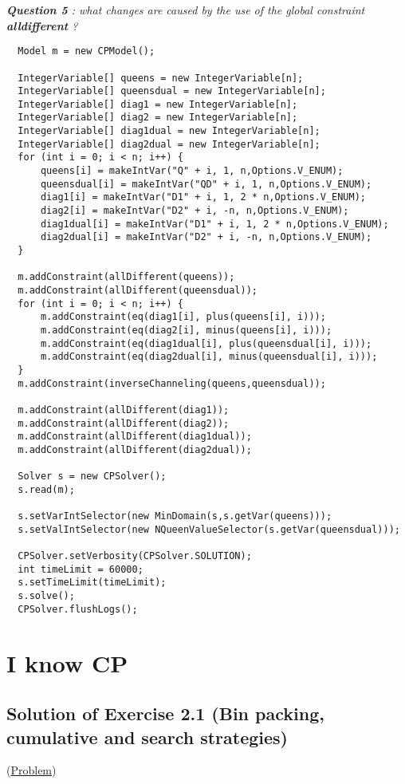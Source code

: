 \noindent\emph{\textbf{Question 5} : what changes are caused by the use of the global constraint \textbf{alldifferent} ?}

\begin{lstlisting}
  Model m = new CPModel();
	
  IntegerVariable[] queens = new IntegerVariable[n];
  IntegerVariable[] queensdual = new IntegerVariable[n];
  IntegerVariable[] diag1 = new IntegerVariable[n];
  IntegerVariable[] diag2 = new IntegerVariable[n];
  IntegerVariable[] diag1dual = new IntegerVariable[n];
  IntegerVariable[] diag2dual = new IntegerVariable[n];
  for (int i = 0; i < n; i++) {
      queens[i] = makeIntVar("Q" + i, 1, n,Options.V_ENUM);
      queensdual[i] = makeIntVar("QD" + i, 1, n,Options.V_ENUM);
      diag1[i] = makeIntVar("D1" + i, 1, 2 * n,Options.V_ENUM);
      diag2[i] = makeIntVar("D2" + i, -n, n,Options.V_ENUM);
      diag1dual[i] = makeIntVar("D1" + i, 1, 2 * n,Options.V_ENUM);
      diag2dual[i] = makeIntVar("D2" + i, -n, n,Options.V_ENUM);
  }
	
  m.addConstraint(allDifferent(queens));
  m.addConstraint(allDifferent(queensdual));
  for (int i = 0; i < n; i++) {
      m.addConstraint(eq(diag1[i], plus(queens[i], i)));
      m.addConstraint(eq(diag2[i], minus(queens[i], i)));
      m.addConstraint(eq(diag1dual[i], plus(queensdual[i], i)));
      m.addConstraint(eq(diag2dual[i], minus(queensdual[i], i)));
  }
  m.addConstraint(inverseChanneling(queens,queensdual));
	
  m.addConstraint(allDifferent(diag1));
  m.addConstraint(allDifferent(diag2));
  m.addConstraint(allDifferent(diag1dual));
  m.addConstraint(allDifferent(diag2dual));
	
  Solver s = new CPSolver();
  s.read(m);
	
  s.setVarIntSelector(new MinDomain(s,s.getVar(queens)));
  s.setValIntSelector(new NQueenValueSelector(s.getVar(queensdual)));
	
  CPSolver.setVerbosity(CPSolver.SOLUTION);
  int timeLimit = 60000;
  s.setTimeLimit(timeLimit);
  s.solve();
  CPSolver.flushLogs();
\end{lstlisting}

\section{I know CP}\label{solutions:iknowcp}\hypertarget{solutions:iknowcp}{}

\subsection{Solution of Exercise 2.1 (Bin packing, cumulative and search strategies)}\label{solutions:solutionofexercise2.1}\hypertarget{solutions:solutionofexercise2.1}{}
(\hyperlink{exercises:exercise2.1}{Problem})

